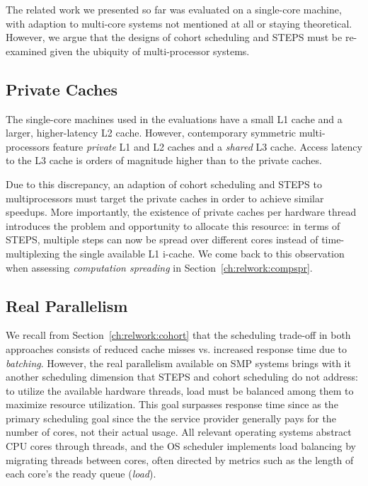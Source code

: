 \documentclass[12pt,a4paper]{book}
\begin{document}
The related work we presented so far was evaluated on a single-core machine, with adaption to multi-core systems not mentioned at all or staying theoretical.~\cite{steps,harizopoulos2003case}\\
However, we argue that the designs of cohort scheduling and STEPS must be re-examined given the ubiquity of multi-processor systems.

\subsection{Private Caches}
The single-core machines used in the evaluations have a small L1 cache and a larger, higher-latency L2 cache.
However, contemporary symmetric multi-processors feature \emph{private} L1 and L2 caches and a \emph{shared} L3 cache.
Access latency to the L3 cache is orders of magnitude higher than to the private caches. 

Due to this discrepancy, an adaption of cohort scheduling and STEPS to multiprocessors must target the private caches in order to achieve similar speedups.
More importantly, the existence of private caches per hardware thread introduces the problem and opportunity to allocate this resource:
in terms of STEPS, multiple steps can now be spread over different cores instead of time-multiplexing the single available L1 i-cache.
We come back to this observation when assessing \emph{computation spreading} in Section~\ref{ch:relwork:compspr}.

\subsection{Real Parallelism}
We recall from Section~\ref{ch:relwork:cohort} that the scheduling trade-off in both approaches consists of reduced cache misses vs. increased response time due to \emph{batching}.
However, the real parallelism available on SMP systems brings with it another scheduling dimension that STEPS and cohort scheduling do not address:
to utilize the available hardware threads, load must be balanced among them to maximize resource utilization.
This goal surpasses response time since as the primary scheduling goal since the the service provider generally pays for the number of cores, not their actual usage.
All relevant operating systems abstract CPU cores through threads, and the OS scheduler implements load balancing by migrating threads between cores, often directed by metrics such as the length of each core's the ready queue (\emph{load}). 
\end{document}

